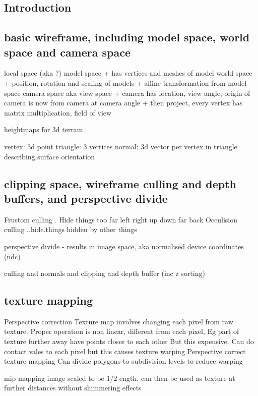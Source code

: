 
\subsection{Introduction}

\subsection{basic wireframe, including model space, world space and camera space}

local space (aka ?) model space
+ has vertices and meshes of model
world space
+ position, rotation and scaling of models
+ affine transformation from model space
camera space aka view space
+ camera has location, view angle, origin of camera is now from camera at camera angle
+ then project, every vertex has matrix multiplication, field of view


heightmaps for 3d terrain

vertex: 3d point
triangle: 3 vertices
normal: 3d vector per vertex in triangle describing surface orientation

\subsection{clipping space, wireframe culling and depth buffers, and perspective divide}

Frustom culling . Hide things too far left right up down far back
Occulision culling ..hide.things hidden by other things

perspective divide - results in image space, aka normalised device coordinates (ndc)


culling and normals and clipping and depth buffer (inc z sorting)

\subsection{texture mapping}

Perspective correction
Texture map involves changing each pixel from raw texture. Proper operation is non linear, different from each pixel, Eg part of texture further away have points closer to each other
But this expensive. Can do contact vales to each pixel but this causes texture warping
Perspective correct texture mapping
Can divide polygons to subdivision levels to reduce warping

mip mapping
image scaled to be 1/2 ength. can then be used as texture  at further distances without shimmering effects

